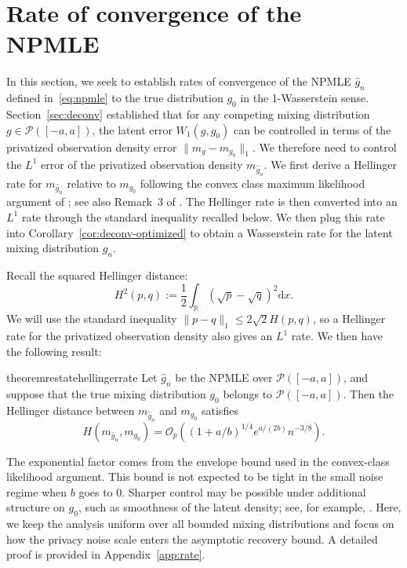 \documentclass[english, 11pt]{article}
\newcommand{\mrd}{\mathrm{d}}
\theoremstyle{plain}
\theoremstyle{definition}
\theoremstyle{remark}
\begin{document}
\section{Rate of convergence of the NPMLE}\label{sec:rate}

In this section, we seek to establish rates of convergence of the NPMLE $\widehat g_n$ defined in~\eqref{eq:npmle} to the true distribution $g_0$ in the 1-Wasserstein sense.
Section~\ref{sec:deconv} established that for any competing mixing distribution $g\in\mathcal P([-a,a])$, the latent error $W_1(g,g_0)$ can be controlled in terms of the privatized observation density error $\|m_g-m_{g_0}\|_1$.
We therefore need {to control the $L^1$ error of the privatized observation density $m_{\widehat g_n}$.} We first derive a Hellinger rate for $m_{\widehat g_n}$ relative to $m_{g_0}$ following the convex class maximum likelihood argument of \cite{van1996rates}; see also Remark~3 of \cite{scricciolo2018bayes}.
The Hellinger rate is then converted into an $L^1$ rate through the standard inequality recalled below.
We then plug this rate into Corollary~\ref{cor:deconv-optimized} to obtain a Wasserstein rate for the latent mixing distribution $\widehat g_n$.

Recall the squared Hellinger distance:
\begin{equation*}
H^2(p,q):=\frac12\int_{\mathbb R}\left(\sqrt p-\sqrt q\right)^2 \mrd x.
\end{equation*}
We will use the standard inequality $\|p-q\|_1\le 2\sqrt{2}H(p,q)$, so a Hellinger rate for the privatized observation density also gives an $L^1$ rate.
We then have the following result:
\begin{restatable}{theorem}{restatehellingerrate}\label{thm:direct-rate}
Let $\widehat g_n$ be the NPMLE over $\mathcal P([-a,a])$, and suppose that the true mixing distribution $g_0$ belongs to $\mathcal P([-a,a])$.
Then the Hellinger distance between $m_{\widehat g_n}$ and $m_{g_0}$ satisfies
\begin{equation}\label{eq:direct-rate}
H(m_{\widehat g_n},m_{g_0}) = \mathcal O_p \left((1+a/b)^{1/4}e^{a/(2b)}n^{-3/8}\right).
\end{equation}
\end{restatable}
The exponential factor comes from the envelope bound used in the convex-class likelihood argument.
This bound is not expected to be tight in the small noise regime when $b$ goes to 0.
Sharper control may be possible under additional structure on $g_0$, such as smoothness of the latent density; see, for example, \cite{fan1991optimal,rousseau2024wasserstein}.
Here, we keep the analysis uniform over all bounded mixing distributions and focus on how the privacy noise scale enters the asymptotic recovery bound.
A detailed proof is provided in Appendix~\ref{app:rate}. 
\end{document}
